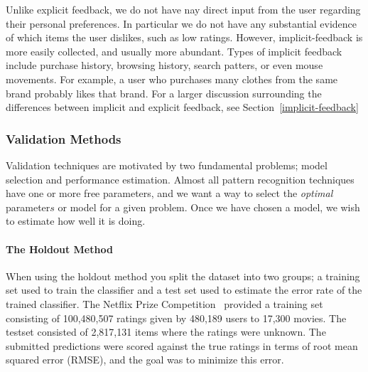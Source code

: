 
Unlike explicit feedback, we do not have nay direct input from the user
regarding their personal preferences. In particular we do not have any
substantial evidence of which items the user dislikes, such as low ratings.
However, implicit-feedback is more easily collected, and usually more abundant.
Types of implicit feedback include purchase history, browsing history, search patters, or even mouse movements. For example, a user who purchases many clothes from the same brand probably likes that brand. For a larger discussion surrounding the differences between
implicit and explicit feedback, see Section~\ref{implicit-feedback}


\subsubsection{Validation Methods}
Validation techniques are motivated by two fundamental problems; model
selection and performance estimation. Almost all pattern recognition techniques
have one or more free parameters, and we want a way to select the
\emph{optimal} parameter\(s\) or model for a given problem. Once we have chosen a
model, we wish to estimate how well it is doing.

\paragraph{The Holdout Method}

When using the holdout method you split the dataset into two groups; a training
set used to train the classifier and a test set used to estimate the error rate
of the trained classifier. The Netflix Prize Competition~\cite{Netflix}
provided a training set consisting of 100,480,507 ratings given by 480,189
users to 17,300 movies. The testset consisted of 2,817,131 items where the
ratings were unknown. The submitted predictions were scored against the true
ratings in terms of root mean squared error (RMSE), and the goal was to
minimize this error.

